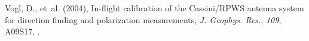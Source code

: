 \documentclass[galley,ras]{agu2001}
\begin{document}
\begin{article}
\begin{thebibliography}{}
 Vogl, D., et~al. (2004), In-flight calibration of the Cassini/RPWS antenna  system for direction finding and polarization measurements, \textit{J.  Geophys. Res.}, \textit{109}, A09S17, .
\end{thebibliography}

%
%
%




%
%
%



\end{article}
\end{document}
